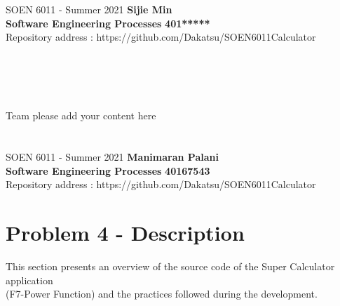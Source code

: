 \documentclass[a4paper, 11pt]{report}
\begin{document}
\pagebreak

\section*{}
\normalsize {SOEN 6011 - Summer 2021} \hfill \textbf{Sijie Min} \\
\textbf{ Software Engineering Processes}  \hfill \textbf{401*****} \\
\hfill Repository address : https://github.com/Dakatsu/SOEN6011Calculator
\\\\\\\\\\
 \begin{center} Team please add your content here \end{center}
\pagebreak

\section*{}
\normalsize {SOEN 6011 - Summer 2021} \hfill \textbf{Manimaran Palani} \\
\textbf{ Software Engineering Processes}  \hfill \textbf{40167543} \\
\hfill Repository address : https://github.com/Dakatsu/SOEN6011Calculator
\\
\section*{\textbf{Problem 4 - Description}}
This section presents an overview of the source code of the Super Calculator application \\(F7-Power Function)  and the
practices followed during the development.
\end{document}
